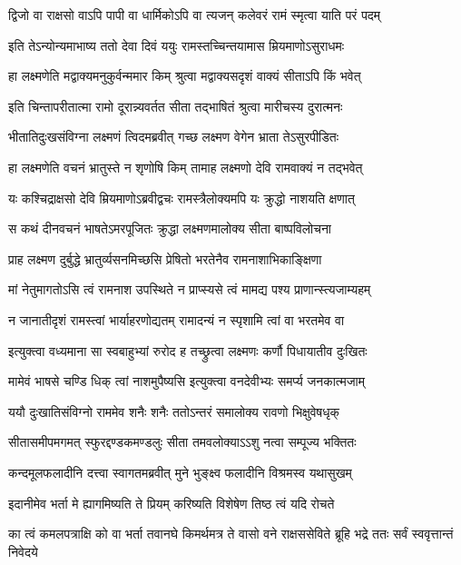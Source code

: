 \twolineshloka
{द्विजो वा राक्षसो वाऽपि पापी वा धार्मिकोऽपि वा}
{त्यजन् कलेवरं रामं स्मृत्वा याति परं पदम्} %

\twolineshloka
{इति तेऽन्योन्यमाभाष्य ततो देवा दिवं ययुः}
{रामस्तच्चिन्तयामास म्रियमाणोऽसुराधमः} %

\twolineshloka
{हा लक्ष्मणेति मद्वाक्यमनुकुर्वन्ममार किम्}
{श्रुत्वा मद्वाक्यसदृशं वाक्यं सीताऽपि किं भवेत्} %

\twolineshloka
{इति चिन्तापरीतात्मा रामो दूरान्न्यवर्तत}
{सीता तद्भाषितं श्रुत्वा मारीचस्य दुरात्मनः} %

\twolineshloka
{भीतातिदुःखसंविग्ना लक्ष्मणं त्विदमब्रवीत्}
{गच्छ लक्ष्मण वेगेन भ्राता तेऽसुरपीडितः} %

\twolineshloka
{हा लक्ष्मणेति वचनं भ्रातुस्ते न शृणोषि किम्}
{तामाह लक्ष्मणो देवि रामवाक्यं न तद्भवेत्} %

\twolineshloka
{यः कश्चिद्राक्षसो देवि म्रियमाणोऽब्रवीद्वचः}
{रामस्त्रैलोक्यमपि यः क्रुद्धो नाशयति क्षणात्} %

\twolineshloka
{स कथं दीनवचनं भाषतेऽमरपूजितः}
{क्रुद्धा लक्ष्मणमालोक्य सीता बाष्पविलोचना} %

\twolineshloka
{प्राह लक्ष्मण दुर्बुद्धे भ्रातुर्व्यसनमिच्छसि}
{प्रेषितो भरतेनैव रामनाशाभिकाङ्क्षिणा} %

\twolineshloka
{मां नेतुमागतोऽसि त्वं रामनाश उपस्थिते}
{न प्राप्स्यसे त्वं मामद्य पश्य प्राणान्स्त्यजाम्यहम्} %

\twolineshloka
{न जानातीदृशं रामस्त्वां भार्याहरणोद्यतम्}
{रामादन्यं न स्पृशामि त्वां वा भरतमेव वा} %

\twolineshloka
{इत्युक्त्वा वध्यमाना सा स्वबाहुभ्यां रुरोद ह}
{तच्छ्रुत्वा लक्ष्मणः कर्णौ पिधायातीव दुःखितः} %

\twolineshloka
{मामेवं भाषसे चण्डि धिक् त्वां नाशमुपैष्यसि}
{इत्युक्त्वा वनदेवीभ्यः समर्प्य जनकात्मजाम्} %

\twolineshloka
{ययौ दुःखातिसंविग्नो राममेव शनैः शनैः}
{ततोऽन्तरं समालोक्य रावणो भिक्षुवेषधृक्} %

\twolineshloka
{सीतासमीपमगमत् स्फुरद्दण्डकमण्डलुः}
{सीता तमवलोक्याऽऽशु नत्वा सम्पूज्य भक्तितः} %

\twolineshloka
{कन्दमूलफलादीनि दत्त्वा स्वागतमब्रवीत्}
{मुने भुङ्क्ष्व फलादीनि विश्रमस्व यथासुखम्} %

\twolineshloka
{इदानीमेव भर्ता मे ह्यागमिष्यति ते प्रियम्}
{करिष्यति विशेषेण तिष्ठ त्वं यदि रोचते} %


\threelineshloka
{का त्वं कमलपत्राक्षि को वा भर्ता तवानघे}
{किमर्थमत्र ते वासो वने राक्षससेविते}
{ब्रूहि भद्रे ततः सर्वं स्ववृत्तान्तं निवेदये} %

